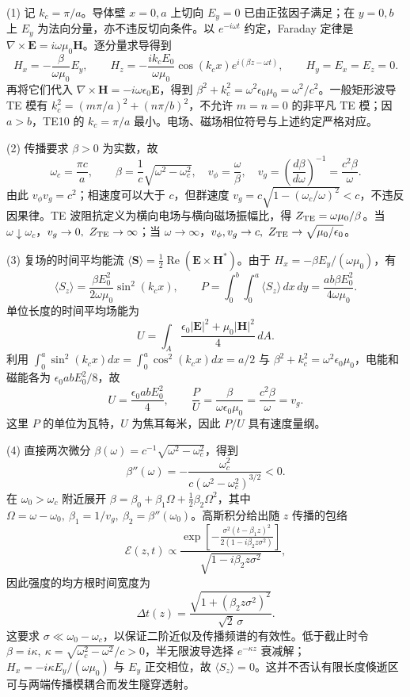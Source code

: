 (1) 记 \(k_c=\pi/a\)。导体壁 \(x=0,a\) 上切向 \(E_y=0\) 已由正弦因子满足；在 \(y=0,b\) 上 \(E_y\) 为法向分量，亦不违反切向条件。以 \(e^{-i\omega t}\) 约定，Faraday 定律是 \(\nabla\times\mathbf E=i\omega\mu_0\mathbf H\)。逐分量求导得到
\[
H_x=-\frac{\beta}{\omega\mu_0}E_y,\qquad
H_z=-\frac{i k_c E_0}{\omega\mu_0}\cos(k_cx)e^{i(\beta z-\omega t)},\qquad H_y=E_x=E_z=0.
\]
再将它们代入 \(\nabla\times\mathbf H=-i\omega\epsilon_0\mathbf E\)，得到 \(\beta^2+k_c^2=\omega^2\epsilon_0\mu_0=\omega^2/c^2\)。一般矩形波导 TE 模有 \(k_c^2=(m\pi/a)^2+(n\pi/b)^2\)，不允许 \(m=n=0\) 的非平凡 TE 模；因 \(a>b\)，TE10 的 \(k_c=\pi/a\) 最小。电场、磁场相位符号与上述约定严格对应。

(2) 传播要求 \(\beta>0\) 为实数，故
\[
\omega_c=\frac{\pi c}{a},\qquad
\beta=\frac1c\sqrt{\omega^2-\omega_c^2},\quad
v_\phi=\frac{\omega}{\beta},\quad
v_g=\left(\frac{d\beta}{d\omega}\right)^{-1}=\frac{c^2\beta}{\omega}.
\]
由此 \(v_\phi v_g=c^2\)；相速度可以大于 \(c\)，但群速度 \(v_g=c\sqrt{1-(\omega_c/\omega)^2}<c\)，不违反因果律。TE 波阻抗定义为横向电场与横向磁场振幅比，得 \(Z_{\rm TE}=\omega\mu_0/\beta\)。当 \(\omega\downarrow\omega_c\)，\(v_g\to0,\ Z_{\rm TE}\to\infty\)；当 \(\omega\to\infty\)，\(v_\phi,v_g\to c,\ Z_{\rm TE}\to\sqrt{\mu_0/\epsilon_0}\)。

(3) 复场的时间平均能流 \(\langle\mathbf S\rangle=\frac12\operatorname{Re}(\mathbf E\times\mathbf H^*)\)。由于 \(H_x=-\beta E_y/(\omega\mu_0)\)，有
\[
\langle S_z\rangle=\frac{\beta E_0^2}{2\omega\mu_0}\sin^2(k_cx),\qquad
\boxed{P=\int_0^b\!\int_0^a\langle S_z\rangle\,dx\,dy
=\frac{ab\beta E_0^2}{4\omega\mu_0}}.
\]
单位长度的时间平均场能为
\[
U=\int_A\frac{\epsilon_0|\mathbf E|^2+\mu_0|\mathbf H|^2}{4}\,dA.
\]
利用 \(\int_0^a\sin^2(k_cx)dx=\int_0^a\cos^2(k_cx)dx=a/2\) 与 \(\beta^2+k_c^2=\omega^2\epsilon_0\mu_0\)，电能和磁能各为 \(\epsilon_0abE_0^2/8\)，故
\[
\boxed{U=\frac{\epsilon_0abE_0^2}{4}},\qquad
\boxed{\frac PU=\frac{\beta}{\omega\epsilon_0\mu_0}
=\frac{c^2\beta}{\omega}=v_g}.
\]
这里 \(P\) 的单位为瓦特，\(U\) 为焦耳每米，因此 \(P/U\) 具有速度量纲。

(4) 直接两次微分 \(\beta(\omega)=c^{-1}\sqrt{\omega^2-\omega_c^2}\)，得到
\[
\boxed{\beta''(\omega)=-\frac{\omega_c^2}{c(\omega^2-\omega_c^2)^{3/2}}<0}.
\]
在 \(\omega_0>\omega_c\) 附近展开 \(\beta=\beta_0+\beta_1\Omega+\tfrac12\beta_2\Omega^2\)，其中 \(\Omega=\omega-\omega_0,\ \beta_1=1/v_g,\ \beta_2=\beta''(\omega_0)\)。高斯积分给出随 \(z\) 传播的包络
\[
\mathcal E(z,t)\propto
\frac{\exp\!\left[-\frac{\sigma^2(t-\beta_1z)^2}{2(1-i\beta_2z\sigma^2)}\right]}
{\sqrt{1-i\beta_2z\sigma^2}},
\]
因此强度的均方根时间宽度为
\[
\boxed{\Delta t(z)=\frac{\sqrt{1+(\beta_2z\sigma^2)^2}}{\sqrt2\,\sigma}}.
\]
这要求 \(\sigma\ll\omega_0-\omega_c\)，以保证二阶近似及传播频谱的有效性。低于截止时令 \(\beta=i\kappa,\ \kappa=\sqrt{\omega_c^2-\omega^2}/c>0\)，半无限波导选择 \(e^{-\kappa z}\) 衰减解；\(H_x=-i\kappa E_y/(\omega\mu_0)\) 与 \(E_y\) 正交相位，故 \(\langle S_z\rangle=0\)。这并不否认有限长度倏逝区可与两端传播模耦合而发生隧穿透射。
